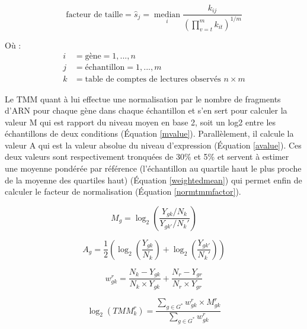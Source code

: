\begin{equation}\label{sizefactor}
    \text{facteur de taille} = \hat{s}_{j}=\underset{i}{\operatorname{median}} \frac{k_{i j}}{\left(\prod_{v=t}^{m} k_{i t}\right)^{1 / m}}
\end{equation}


Où :
\begin{align*}
i & = \text{gène} = 1,..., n \\
j & = \text{échantillon} = 1,..., m \\
k & = \text{table de comptes de lectures observés } n \times m 
\end{align*}

Le TMM quant à lui effectue une normalisation par le nombre de fragments d'ARN pour chaque gène dans chaque échantillon et s'en sert pour calculer la valeur M qui est rapport du niveau moyen en base 2, soit un log2 entre les échantillons de deux conditions (Équation \ref{mvalue}). Parallèlement, il calcule la valeur A qui est la valeur absolue du niveau d'expression (Équation \ref{avalue}). Ces deux valeurs sont respectivement tronquées de 30\% et 5\% et servent à estimer une moyenne pondérée par référence (l'échantillon au quartile haut le plus proche de la moyenne des quartiles haut) (Équation \ref{weightedmean}) qui permet enfin de calculer le facteur de normalisation (Équation \ref{normtmmfactor}).

\begin{equation}\label{mvalue}
    M_g = \log_{2} \left(\frac{Y_{gk} / N_k}{Y_{gk'} / N_k'}\right)
\end{equation}

\begin{equation}\label{avalue}
    A_g = \frac{1}{2} \left(\log_{2} \left(\frac{Y_{gk}}{N_k} \right) + \log_2 \left(\frac{Y_{gk'}}{N_k'}\right)\right)
\end{equation}

\begin{equation}\label{weightedmean}
    w^r_{gk} = \frac{N_k - Y_{gk}}{N_k \times Y_{gk}} + \frac{N_r - Y_{gr}}{N_r \times Y_{gr}}
\end{equation}

\begin{equation}\label{normtmmfactor}
    \log_2{} (TMM^r_k) = \frac{\sum_{g \in G^*} w^r_{gk} \times M^r_{gk}}{\sum_{g \in G^*} w^r_{gk}}
\end{equation}

